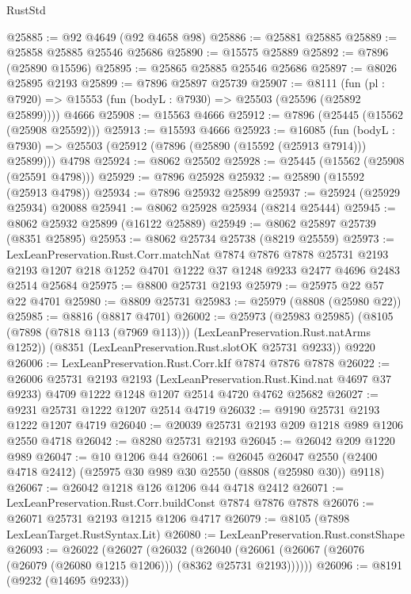 \begin{lexlean}{RustStd}
\begin{coremodule}
@25885 := @92 @4649 (@92 @4658 @98)
@25886 := @25881 @25885
@25889 := @25858 @25885 @25546 @25686
@25890 := @15575 @25889
@25892 := @7896 (@25890 @15596)
@25895 := @25865 @25885 @25546 @25686
@25897 := @8026 @25895 @2193
@25899 := @7896 @25897 @25739
@25907 := @8111
    (fun (pl : @7920) => @15553 (fun (bodyL : @7930) => @25503 (@25596 (@25892 @25899))))
    @4666
@25908 := @15563 @4666
@25912 := @7896 (@25445 (@15562 (@25908 @25592)))
@25913 := @15593 @4666
@25923 := @16085
    (fun (bodyL : @7930) => @25503 (@25912 (@7896 (@25890 (@15592 (@25913 @7914))) @25899)))
    @4798
@25924 := @8062 @25502
@25928 := @25445 (@15562 (@25908 (@25591 @4798)))
@25929 := @7896 @25928
@25932 := @25890 (@15592 (@25913 @4798))
@25934 := @7896 @25932 @25899
@25937 := @25924 (@25929 @25934) @20088
@25941 := @8062 @25928 @25934 (@8214 @25444)
@25945 := @8062 @25932 @25899 (@16122 @25889)
@25949 := @8062 @25897 @25739 (@8351 @25895)
@25953 := @8062 @25734 @25738 (@8219 @25559)
@25973 := LexLeanPreservation.Rust.Corr.matchNat
    @7874
    @7876
    @7878
    @25731
    @2193
    @2193
    @1207
    @218
    @1252
    @4701
    @1222
    @37
    @1248
    @9233
    @2477
    @4696
    @2483
    @2514
    @25684
@25975 := @8800 @25731 @2193
@25979 := @25975 @22 @57 @22 @4701
@25980 := @8809 @25731
@25983 := @25979 (@8808 (@25980 @22))
@25985 := @8816 (@8817 @4701)
@26002 := @25973
    (@25983 @25985)
    (@8105 (@7898 (@7818 @113 (@7969 @113))) (LexLeanPreservation.Rust.natArms @1252))
    (@8351 (LexLeanPreservation.Rust.slotOK @25731 @9233))
    @9220
@26006 := LexLeanPreservation.Rust.Corr.kIf @7874 @7876 @7878
@26022 := @26006
    @25731
    @2193
    @2193
    (LexLeanPreservation.Rust.Kind.nat @4697 @37 @9233)
    @4709
    @1222
    @1248
    @1207
    @2514
    @4720
    @4762
    @25682
@26027 := @9231 @25731 @1222 @1207 @2514 @4719
@26032 := @9190 @25731 @2193 @1222 @1207 @4719
@26040 := @20039 @25731 @2193 @209 @1218 @989 @1206 @2550 @4718
@26042 := @8280 @25731 @2193
@26045 := @26042 @209 @1220 @989
@26047 := @10 @1206 @44
@26061 := @26045
    @26047
    @2550
    (@2400 @4718 @2412)
    (@25975 @30 @989 @30 @2550 (@8808 (@25980 @30)) @9118)
@26067 := @26042 @1218 @126 @1206 @44 @4718 @2412
@26071 := LexLeanPreservation.Rust.Corr.buildConst @7874 @7876 @7878
@26076 := @26071 @25731 @2193 @1215 @1206 @4717
@26079 := @8105 (@7898 LexLeanTarget.RustSyntax.Lit)
@26080 := LexLeanPreservation.Rust.constShape
@26093 := @26022
    (@26027
      (@26032
        (@26040 (@26061 (@26067 (@26076 (@26079 (@26080 @1215 @1206))) (@8362 @25731 @2193))))))
@26096 := @8191 (@9232 (@14695 @9233))

\end{coremodule}
\end{lexlean}
